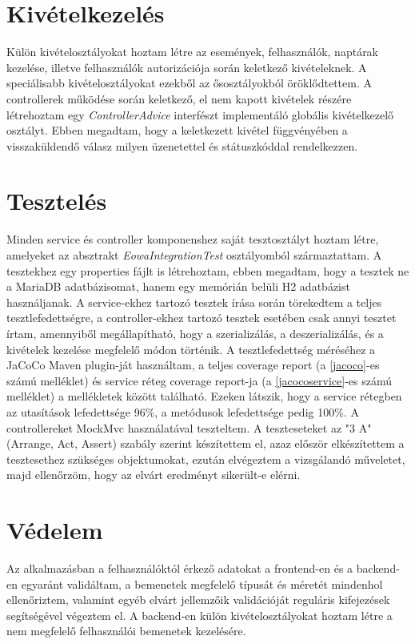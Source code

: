 \documentclass[a4paper,12pt]{report}
\theoremstyle{definition}
\theoremstyle{remark}
\begin{document}
\section{Kivételkezelés}

Külön kivételosztályokat hoztam létre az események, felhasználók, naptárak kezelése, illetve felhasználók autorizációja során keletkező kivételeknek. A speciálisabb kivételosztályokat ezekből az ősosztályokból öröklődtettem. A controllerek működése során keletkező, el nem kapott kivételek részére létrehoztam egy \textit{ControllerAdvice} interfészt implementáló globális kivételkezelő osztályt. Ebben megadtam, hogy a keletkezett kivétel függvényében a visszaküldendő válasz milyen üzenetettel és státuszkóddal rendelkezzen.

\section{Tesztelés}

Minden service és controller komponenshez saját tesztosztályt hoztam létre, amelyeket az absztrakt \textit{EowaIntegrationTest} osztályomból származtattam.  A tesztekhez egy properties fájlt is létrehoztam, ebben megadtam, hogy a tesztek ne a MariaDB adatbázisomat, hanem egy memórián belüli H2 adatbázist használjanak. A service-ekhez tartozó tesztek írása során törekedtem a teljes tesztlefedettségre, a controller-ekhez tartozó tesztek esetében csak annyi tesztet írtam, amennyiből megállapítható, hogy a szerializálás, a deszerializálás, és a kivételek kezelése megfelelő módon történik. A tesztlefedettség méréséhez a JaCoCo\cite{Jacocowebsite} Maven plugin-ját használtam, a teljes coverage report (a \ref{jacoco}-es számú melléklet)  és service réteg coverage report-ja (a \ref{jacocoservice}-es számú melléklet) a mellékletek között található. Ezeken látszik, hogy a service rétegben az utasítások lefedettsége 96\%, a metódusok lefedettsége pedig 100\%. A controllereket MockMvc használatával teszteltem. A teszteseteket az "3 A"\cite{3Awebsite} (Arrange, Act, Assert) szabály szerint készítettem el, azaz először elkészítettem a tesztesethez szükséges objektumokat, ezután elvégeztem a vizsgálandó műveletet, majd ellenőrzöm, hogy az elvárt eredményt sikerült-e elérni.

\section{Védelem}

Az alkalmazásban a felhasználóktól érkező adatokat a frontend-en és a backend-en egyaránt validáltam, a bemenetek megfelelő típusát és méretét mindenhol ellenőriztem, valamint egyéb elvárt jellemzőik validációját reguláris kifejezések segítségével végeztem el. A backend-en külön kivételosztályokat hoztam létre a nem megfelelő felhasználói bemenetek kezelésére.
\end{document}
